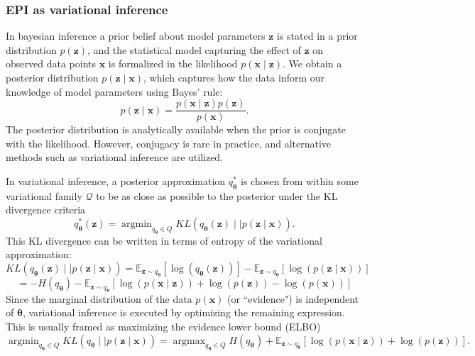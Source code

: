 \documentclass[11pt]{article}
\DeclareMathOperator*{\argmin}{argmin}
\DeclareMathOperator*{\argmax}{argmax}
\begin{document}
\subsubsection{EPI as variational inference}\label{methods_VI}
In bayesian inference a prior belief about model parameters $\mathbf{z}$ is stated in a prior distribution $p(\mathbf{z})$, and the statistical model capturing the effect of $\mathbf{z}$ on observed data points $\mathbf{x}$ is formalized in the likelihood $p(\mathbf{x} \mid \mathbf{z})$.
We obtain a posterior distribution $p(\mathbf{z} \mid \mathbf{x})$, which captures how the data inform our knowledge of model parameters using Bayes' rule:
\begin{equation}
p(\mathbf{z} \mid \mathbf{x}) = \frac{p(\mathbf{x} \mid \mathbf{z}) p(\mathbf{z})}{p(\mathbf{x})}.
\end{equation}
The posterior distribution is analytically available when the prior is conjugate with the likelihood.
However, conjugacy is rare in practice, and alternative methods such as variational inference \cite{saul1998mean} are utilized.

In variational inference, a posterior approximation $q_{\bm{\theta}}^*$ is chosen from within some variational family $\mathcal{Q}$ to be as close as possible to the posterior under the KL divergence criteria
\begin{equation}
q_{\bm{\theta}}^*(\mathbf{z}) = \argmin_{q_{\bm{\theta}} \in Q} KL(q_{\bm{\theta}}(\mathbf{z}) \mid \mid p(\mathbf{z} \mid \mathbf{x})).
\end{equation}
This KL divergence can be written in terms of entropy of the variational approximation:
\begin{equation}
KL(q_{\bm{\theta}}(\mathbf{z})  \mid \mid p(\mathbf{z} \mid \mathbf{x})) = \mathbb{E}_{\mathbf{z} \sim q_{\bm{\theta}}} \left[ \log (q_{\bm{\theta}}(\mathbf{z})) \right] - \mathbb{E}_{\mathbf{z} \sim q_{\bm{\theta}}} \left[ \log (p(\mathbf{z} \mid \mathbf{x})) \right]
\end{equation}
\begin{equation}
= -H(q_{\bm{\theta}}) - \mathbb{E}_{\mathbf{z} \sim q_{\bm{\theta}}} \left[ \log (p(\mathbf{x} \mid \mathbf{z}))  + \log(p(\mathbf{z})) - \log(p(\mathbf{x}))\right]
\end{equation}
Since the marginal distribution of the data $p(\mathbf{x})$ (or ``evidence") is independent of $\bm{\theta}$, variational inference is executed by optimizing the remaining expression.
This is usually framed as maximizing the evidence lower bound (ELBO)
\begin{equation} \label{eq:VI_opt}
\argmin_{q_{\bm{\theta}} \in Q} KL(q_{\bm{\theta}} \mid \mid p(\mathbf{z} \mid \mathbf{x})) = \argmax_{q_{\bm{\theta}} \in Q} H(q_{\bm{\theta}}) + \mathbb{E}_{\mathbf{z} \sim q_{\bm{\theta}}} \left[ \log (p(\mathbf{x} \mid \mathbf{z}))  + \log(p(\mathbf{z}))\right].
\end{equation}
\end{document}
